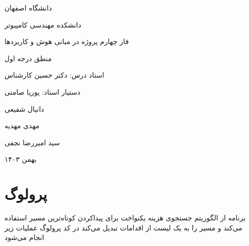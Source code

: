 \documentclass[11pt, a4paper, oneside]{article}
\begin{document}
	
	\begin{titlepage}
		\centering
		\par
	
		\vspace{1cm}
    \par %
		
		\vspace{1mm}
		{\LARGE دانشگاه اصفهان}\par
		\vspace{1mm}
		{\Large دانشکده مهندسی کامپیوتر}\par
		
		\vspace{2cm}
		
		{\Large فاز چهارم پروژه در مبانی هوش و کاربردها}\par
		\vspace{1cm}
		{\Huge منطق درجه اول}\par
		
		
		\vspace{2cm}
		{\Large استاد درس: دکتر حسین کارشناس}\par
		\vspace{0.5cm}
		{\Large دستیار استاد: پوریا صامتی}
		
		\vspace{1cm}
		{\Large دانیال شفیعی}\par
		{\Large مهدی مهدیه}\par
		{\Large سید امیررضا نجفی}\par
		
		\vspace{1.5cm}
		
		{\large بهمن ۱۴۰۳\par}
	\end{titlepage}
	\tableofcontents
	\newpage

	\section{پرولوگ}
		برنامه از الگوریتم جستجوی هزینه یکنواخت برای پیداکردن کوتاه‌ترین مسیر استفاده می‌کند و مسیر را به یک لیست از اقدامات تبدیل می‌کند در کد پرولوگ عملیات زیر انجام می‌شود
\end{document}
